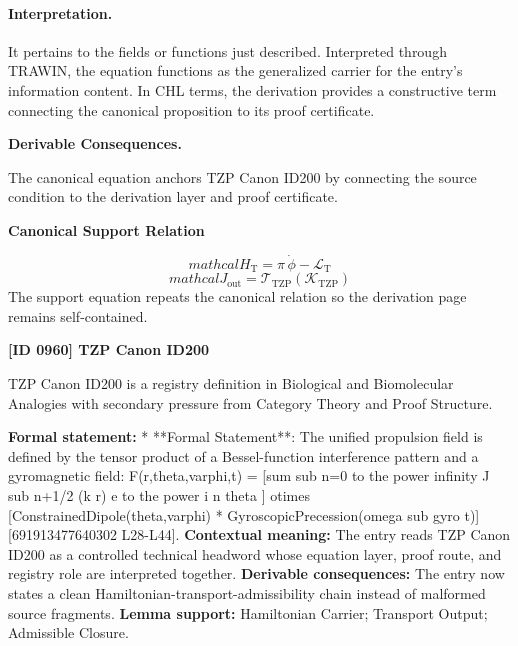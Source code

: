 \paragraph{Interpretation.}
It pertains to the fields or functions just described. Interpreted through TRAWIN, the equation functions as the generalized carrier for the entry’s information content. In CHL terms, the derivation provides a constructive term connecting the canonical proposition to its proof certificate.

\par\vspace{0.35em}
\noindent\textbf{Derivable Consequences.}\quad
\begingroup
\footnotesize
\raggedright
The canonical equation anchors TZP Canon ID200 by connecting the source condition to the derivation layer and proof certificate.
\par\endgroup

\noindent\textbf{Canonical Support Relation}\par
\[
mathcal{H}_{\mathrm{T}}=\pi\,\dot{\phi}-\mathcal{L}_{\mathrm{T}}
\]
\[
mathcal{J}_{\mathrm{out}} = \mathcal{T}_{\mathrm{TZP}}\!\left(\mathcal{K}_{\mathrm{TZP}}\right)
\]
\noindent The support equation repeats the canonical relation so the derivation page remains self-contained.\par

\clearpage
\noindent\textbf{[ID 0960] TZP Canon ID200}\par
\vspace{0.35em}
\begingroup\small
{}
TZP Canon ID200 is a registry definition in Biological and Biomolecular Analogies with secondary pressure from Category Theory and Proof Structure.

\begingroup\footnotesize\setlength{\emergencystretch}{3em}\sloppy
\textbf{Formal statement:} * **Formal Statement**: The unified propulsion field is defined by the tensor product of a Bessel-function interference pattern and a gyromagnetic field: F(r,theta,varphi,t) = [sum sub n=0 to the power infinity J sub n+1/2 (k r) e to the power i n theta ] otimes [ConstrainedDipole(theta,varphi) * GyroscopicPrecession(omega sub gyro t)][691913477640302 L28-L44]. \textbf{Contextual meaning:} The entry reads TZP Canon ID200 as a controlled technical headword whose equation layer, proof route, and registry role are interpreted together. \textbf{Derivable consequences:} The entry now states a clean Hamiltonian-transport-admissibility chain instead of malformed source fragments. \textbf{Lemma support:} Hamiltonian Carrier; Transport Output; Admissible Closure.\par
\endgroup

